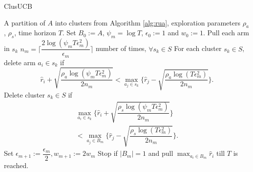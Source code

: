 \begin{algorithm}[t]
\caption{ClusUCB}
\label{alg:clusucb}
\begin{algorithmic}
 A partition of $A$ into clusters from Algorithm \ref{alg:rua}, exploration parameters $\rho_a$, $\rho_s$, time horizon $T$.
 Set $B_{0}:=A$, $\psi_{m}=\log T$, $\epsilon_{0}:=1$ and $w_{0}:=1$.
\State Pull each arm in $s_{k}$ $n_{m}=\bigg\lceil\dfrac{2\log{(\psi_{m}T\epsilon_{m}^{2})}}{\epsilon_{m}}\bigg\rceil$ number of times, $\forall s_{k}\in S$ 
\ArmElim
\State For each cluster $s_k \in S$, delete arm $a_{i}\in s_{k}$ if
$$\hat{r}_{i} + \sqrt{\dfrac{\rho_{a}\log{(\psi_{m}T\epsilon_{m}^{2})}}{2 n_{m}}}  < \max_{a_{j}\in s_{k}}\bigg\lbrace\hat{r}_{j} -\sqrt{\dfrac{\rho_{a}\log{(T\epsilon_{m}^{2})}}{2 n_{m}}} \bigg\rbrace.$$
\EndArmElim
\ClusElim
\State Delete cluster $s_{k}\in S$ if 
\begin{align*}
 \max_{a_{i}\in s_{k}}\bigg\lbrace\hat{r}_{i} + \sqrt{\dfrac{\rho_{s}\log{(\psi_{m}T\epsilon_{m}^{2})}}{2 n_{m}}}\bigg\rbrace  \\
 < \max_{a_{j}\in B_{m}} \bigg\lbrace\hat{r}_{j} - \sqrt{\dfrac{\rho_{s} \log{(T\epsilon_{m}^{2})}}{2 n_{m}}}\bigg\rbrace.
\end{align*}
\EndClusElim
\State Set $\epsilon_{m+1}:=\dfrac{\epsilon_{m}}{2},w_{m+1}:=2w_{m}$
\State Stop if $|B_{m}|=1$ and pull $\max_{a_{i}\in B_{m}}\hat{r}_{i}$ till $T$ is reached.
\EndFor
\end{algorithmic}
\end{algorithm}

